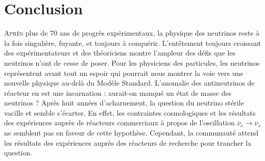 

\chapter*{Conclusion}
\label{chap:conclusion}



\lettrine{A}{près} plus de 70 ans de progrès expérimentaux, la physique des neutrinos reste à la fois singulière, fuyante, et toujours à conquérir. L'entêtement toujours croissant des expérimentateurs et des théoriciens montre l'ampleur des défis que les neutrinos n'ont de cesse de poser. Pour les physiciens des particules, les neutrinos représentent avant tout un espoir qui pourrait nous montrer la voie vers une nouvelle physique au-delà du Modèle Standard. L'anomalie des antineutrinos de réacteur en est une incarnation : aurait-on manqué un état de masse des neutrinos ? Après huit années d'acharnement, la question du neutrino stérile vacille et semble s'écarter. En effet, les contraintes cosmologiques et les résultats des expériences auprès de réacteurs commerciaux à propos de l'oscillation $\overline{\nu}_e \rightarrow \overline{\nu}_s$ ne semblent pas en faveur de cette hypothèse. Cependant, la communauté attend les résultats des expériences auprès des réacteurs de recherche pour trancher la question.\\

